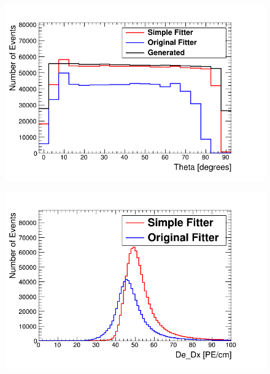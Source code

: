 \begin{figure}[H]
 \centering
 \includegraphics[width=0.8\linewidth]{Chapter5/Figs/Raster/thetaComarison.png}
 \label{fig:thetaGenVsRecoHem}
\end{figure}

\begin{figure}[H]
 \centering
 \includegraphics[width=0.8\linewidth]{Chapter5/Figs/Raster/dedxComarison.png}
 \label{fig:dedxGenVsRecoHem}
\end{figure}

